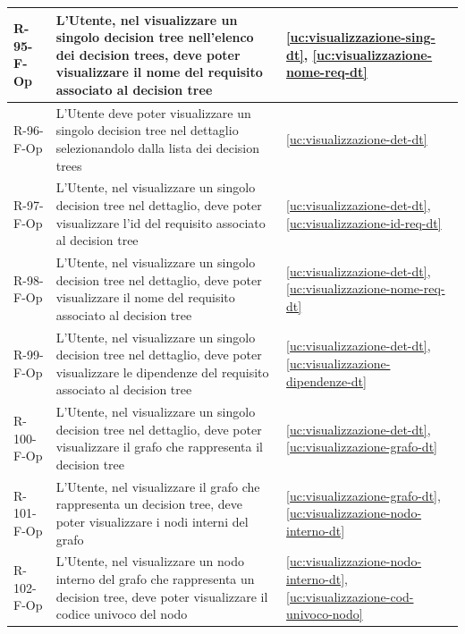 ﻿\documentclass[a4paper,12pt]{article}
\begin{document}
{{\begin{longtable}{|l|p{}|p{}|}
            R-95-F-Op       & L'Utente, nel visualizzare un singolo decision tree nell'elenco dei decision trees, deve poter visualizzare il nome del requisito associato al decision tree                                & \ref{uc:visualizzazione-sing-dt}, \ref{uc:visualizzazione-nome-req-dt}             \\ \hline
            R-96-F-Op       & L'Utente deve poter visualizzare un singolo decision tree nel dettaglio selezionandolo dalla lista dei decision trees                                                                       & \ref{uc:visualizzazione-det-dt}                                               \\ \hline
            R-97-F-Op       & L'Utente, nel visualizzare un singolo decision tree nel dettaglio, deve poter visualizzare l'id del requisito associato al decision tree                                                    & \ref{uc:visualizzazione-det-dt}, \ref{uc:visualizzazione-id-req-dt}                 \\ \hline
            R-98-F-Op       & L'Utente, nel visualizzare un singolo decision tree nel dettaglio, deve poter visualizzare il nome del requisito associato al decision tree                                                 & \ref{uc:visualizzazione-det-dt}, \ref{uc:visualizzazione-nome-req-dt}                 \\ \hline
            R-99-F-Op       & L'Utente, nel visualizzare un singolo decision tree nel dettaglio, deve poter visualizzare le dipendenze del requisito associato al decision tree                                           & \ref{uc:visualizzazione-det-dt}, \ref{uc:visualizzazione-dipendenze-dt}                 \\ \hline
            R-100-F-Op       & L'Utente, nel visualizzare un singolo decision tree nel dettaglio, deve poter visualizzare il grafo che rappresenta il decision tree                                                        & \ref{uc:visualizzazione-det-dt}, \ref{uc:visualizzazione-grafo-dt}                 \\ \hline
            R-101-F-Op       & L'Utente, nel visualizzare il grafo che rappresenta un decision tree, deve poter visualizzare i nodi interni del grafo                                                                      & \ref{uc:visualizzazione-grafo-dt}, \ref{uc:visualizzazione-nodo-interno-dt}         \\ \hline
            R-102-F-Op       & L'Utente, nel visualizzare un nodo interno del grafo che rappresenta un decision tree, deve poter visualizzare il codice univoco del nodo                                                   & \ref{uc:visualizzazione-nodo-interno-dt}, \ref{uc:visualizzazione-cod-univoco-nodo} \\ \hline

\end{longtable}}}
\end{document}
